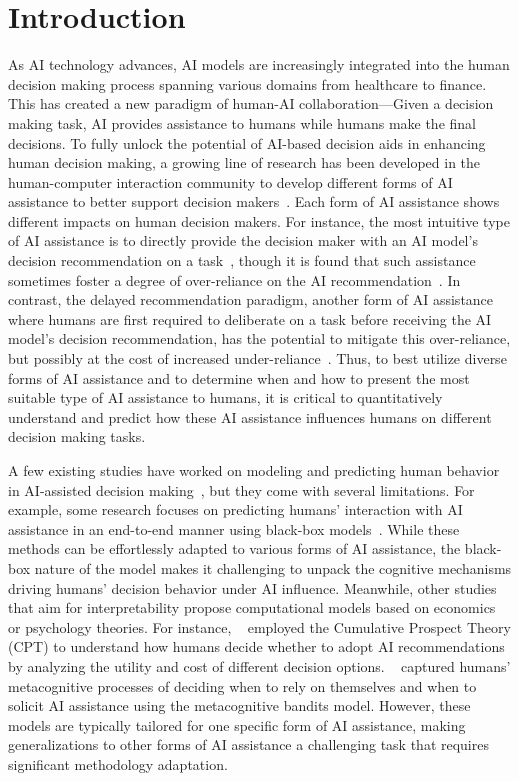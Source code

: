 \documentclass[letterpaper]{article} %
\begin{document}
\section{Introduction}
As AI technology advances, AI models are increasingly integrated into the human decision making process  spanning various domains from healthcare to finance. This has created a new paradigm of human-AI collaboration---Given a decision making task, AI provides assistance to humans while humans make the final decisions. To fully unlock the potential of AI-based decision aids in enhancing human decision making, a growing line of research has been developed in the human-computer interaction community to develop different forms of AI assistance to better support decision makers~\cite{Lai2023TowardsAS}. Each form of AI assistance shows different impacts on human decision makers.  
For instance, the most intuitive type of AI assistance is to directly provide the decision maker with an AI model's decision recommendation on a task~\cite{passi2022overreliance,wang2023effects}, though it is found that such assistance sometimes foster a degree of over-reliance on the AI recommendation~\cite{Ma2023WhoSI}. In contrast, the delayed recommendation paradigm,  another form of AI assistance where humans are first required to deliberate on a task before receiving the AI model's decision recommendation, has the potential to mitigate this over-reliance, but possibly at the cost of increased under-reliance~\cite{Buccinca2021ToTO, Fogliato2022WhoGF}. 
Thus, to best utilize diverse forms of AI assistance and to determine when and how to present the most suitable type of AI assistance to humans, it is critical to quantitatively understand and predict how these AI assistance influences humans on different decision making tasks. 


A few existing studies have worked on modeling and predicting human behavior in AI-assisted decision making~\cite{kumar2021explaining,Bansal2021IsTM}, but they come with several limitations. For example, some research focuses on predicting humans' interaction with AI assistance in an end-to-end manner using black-box models~\cite{subrahmanian2017predicting}. While these methods can be effortlessly adapted to various forms of AI assistance,  the black-box nature of the model makes it challenging to unpack the cognitive mechanisms driving humans' decision behavior under AI influence.  Meanwhile, other studies that aim for interpretability propose computational models based on 
economics or psychology theories. For instance, \citeauthor{wang2022will}~ employed the Cumulative Prospect Theory (CPT) to understand how humans decide whether to adopt AI recommendations by analyzing the utility and cost of different decision options. \citeauthor{kumar2021explaining}~
captured humans' metacognitive processes of deciding when to rely on themselves and when to solicit AI assistance using  
the metacognitive bandits model.
However, these models 
are typically tailored for one specific form of AI assistance, making generalizations to other forms of AI assistance a challenging task that requires significant methodology adaptation.
 
\end{document}

